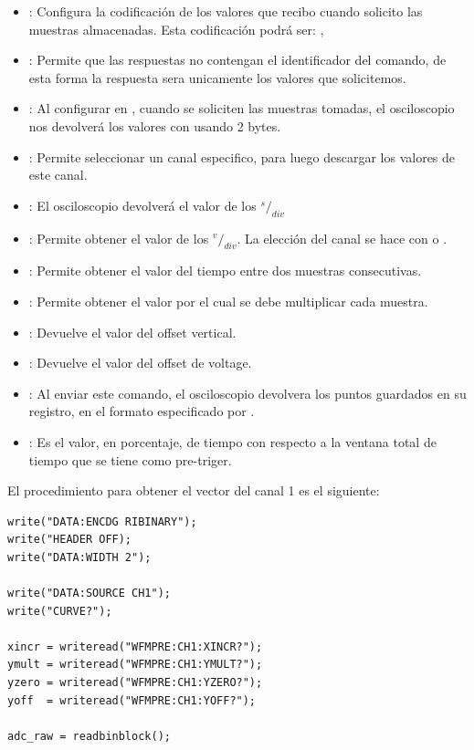 \begin{itemize}
	\item {}: Configura la codificación de los valores que recibo cuando solicito las muestras almacenadas.
	Esta codificación podrá ser: , 
	\item {}: Permite que las respuestas no contengan el identificador del comando, de esta forma la respuesta sera unicamente los valores que solicitemos.
	\item {}: Al configurar en , cuando se soliciten las muestras tomadas, el osciloscopio nos devolverá los valores con usando 2 bytes.
	\item {}: Permite seleccionar un canal especifico, para luego descargar los valores de este canal.
	\item {}: El osciloscopio devolverá el valor de los $^s/_{div}$
	\item {}: Permite obtener el valor de los $^v/_{div}$. La elección del canal se hace con  o .
	\item {}: Permite obtener el valor del tiempo entre dos muestras consecutivas.
	\item {}: Permite obtener el valor por el cual se debe multiplicar cada muestra.
	\item {}: Devuelve el valor del offset vertical.
	\item {}: Devuelve el valor del offset de voltage.
	\item {}: Al enviar este comando, el osciloscopio devolvera los puntos guardados en su registro, en el formato especificado por .
	\item {}: Es el valor, en porcentaje, de tiempo con respecto a la ventana total de tiempo que se tiene como pre-triger.
\end{itemize}

\vspace{5mm}
El procedimiento para obtener el vector del canal 1 es el siguiente:


\begin{lstlisting}[style=rawStyle]
write("DATA:ENCDG RIBINARY");
write("HEADER OFF);
write("DATA:WIDTH 2");

write("DATA:SOURCE CH1");
write("CURVE?");

xincr = writeread("WFMPRE:CH1:XINCR?");
ymult = writeread("WFMPRE:CH1:YMULT?");
yzero = writeread("WFMPRE:CH1:YZERO?");
yoff  = writeread("WFMPRE:CH1:YOFF?");

adc_raw = readbinblock();
\end{lstlisting}

